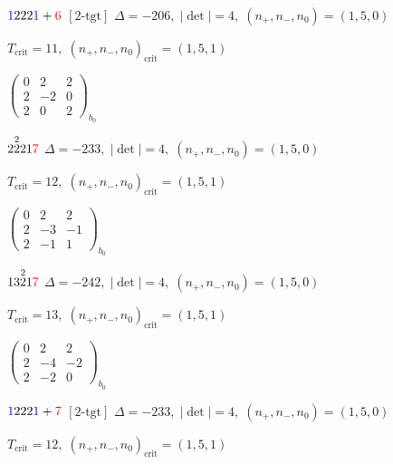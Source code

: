 \documentclass[10pt]{article}
\begin{document}
\smallskip

$\textcolor{blue}{1}222\textcolor{blue}{1}+\textcolor{red}{6}$ $\scriptstyle [2\text{-tgt}]$ \quad $\Delta=-206,\; |\det|=4,\; (n_+,n_-,n_0)=(1,5,0)$

\hspace{1em}$T_{\text{crit}}=11,\; (n_+,n_-,n_0)_{\text{crit}}=(1,5,1)$

\hspace{2em}$\left(\begin{smallmatrix}0 & 2 & 2 \\ 2 & -2 & 0 \\ 2 & 0 & 2\end{smallmatrix}\right)_{\!b_0}$

\smallskip

$2\overset{2}{2}21\textcolor{red}{7}$ \quad $\Delta=-233,\; |\det|=4,\; (n_+,n_-,n_0)=(1,5,0)$

\hspace{1em}$T_{\text{crit}}=12,\; (n_+,n_-,n_0)_{\text{crit}}=(1,5,1)$

\hspace{2em}$\left(\begin{smallmatrix}0 & 2 & 2 \\ 2 & -3 & -1 \\ 2 & -1 & 1\end{smallmatrix}\right)_{\!b_0}$

\smallskip

$13\overset{2}{2}1\textcolor{red}{7}$ \quad $\Delta=-242,\; |\det|=4,\; (n_+,n_-,n_0)=(1,5,0)$

\hspace{1em}$T_{\text{crit}}=13,\; (n_+,n_-,n_0)_{\text{crit}}=(1,5,1)$

\hspace{2em}$\left(\begin{smallmatrix}0 & 2 & 2 \\ 2 & -4 & -2 \\ 2 & -2 & 0\end{smallmatrix}\right)_{\!b_0}$

\smallskip

$\textcolor{blue}{1}222\textcolor{blue}{1}+\textcolor{red}{7}$ $\scriptstyle [2\text{-tgt}]$ \quad $\Delta=-233,\; |\det|=4,\; (n_+,n_-,n_0)=(1,5,0)$

\hspace{1em}$T_{\text{crit}}=12,\; (n_+,n_-,n_0)_{\text{crit}}=(1,5,1)$
\end{document}
